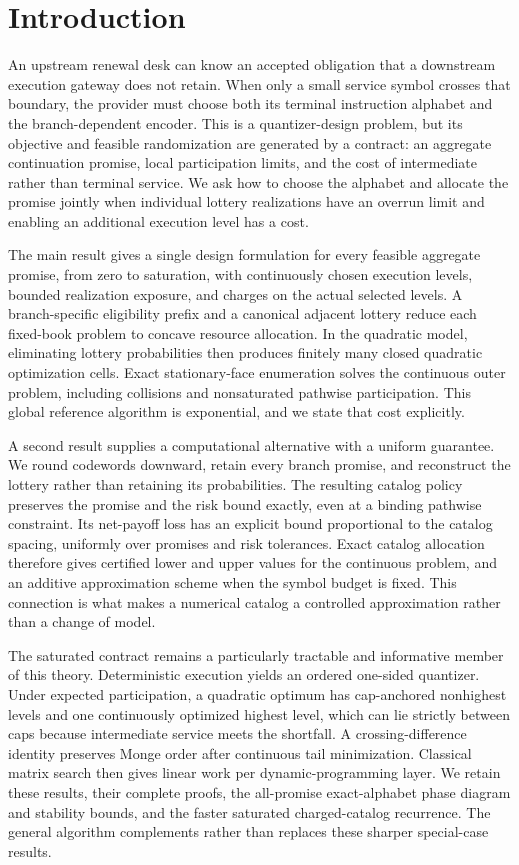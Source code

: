 \section{Introduction}
An upstream renewal desk can know an accepted obligation that a downstream execution gateway does not retain. When only a small service symbol crosses that boundary, the provider must choose both its terminal instruction alphabet and the branch-dependent encoder. This is a quantizer-design problem, but its objective and feasible randomization are generated by a contract: an aggregate continuation promise, local participation limits, and the cost of intermediate rather than terminal service. We ask how to choose the alphabet and allocate the promise jointly when individual lottery realizations have an overrun limit and enabling an additional execution level has a cost.

The main result gives a single design formulation for every feasible aggregate promise, from zero to saturation, with continuously chosen execution levels, bounded realization exposure, and charges on the actual selected levels. A branch-specific eligibility prefix and a canonical adjacent lottery reduce each fixed-book problem to concave resource allocation. In the quadratic model, eliminating lottery probabilities then produces finitely many closed quadratic optimization cells. Exact stationary-face enumeration solves the continuous outer problem, including collisions and nonsaturated pathwise participation. This global reference algorithm is exponential, and we state that cost explicitly.

A second result supplies a computational alternative with a uniform guarantee. We round codewords downward, retain every branch promise, and reconstruct the lottery rather than retaining its probabilities. The resulting catalog policy preserves the promise and the risk bound exactly, even at a binding pathwise constraint. Its net-payoff loss has an explicit bound proportional to the catalog spacing, uniformly over promises and risk tolerances. Exact catalog allocation therefore gives certified lower and upper values for the continuous problem, and an additive approximation scheme when the symbol budget is fixed. This connection is what makes a numerical catalog a controlled approximation rather than a change of model.

The saturated contract remains a particularly tractable and informative member of this theory. Deterministic execution yields an ordered one-sided quantizer. Under expected participation, a quadratic optimum has cap-anchored nonhighest levels and one continuously optimized highest level, which can lie strictly between caps because intermediate service meets the shortfall. A crossing-difference identity preserves Monge order after continuous tail minimization. Classical matrix search then gives linear work per dynamic-programming layer. We retain these results, their complete proofs, the all-promise exact-alphabet phase diagram and stability bounds, and the faster saturated charged-catalog recurrence. The general algorithm complements rather than replaces these sharper special-case results.

